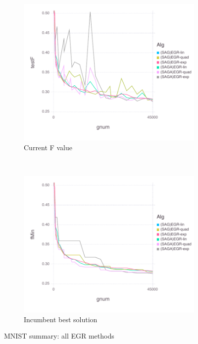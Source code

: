 \documentclass[11pt]{article}
\begin{document}
      \begin{figure}[H]
          \centering
          \begin{subfigure}[b]{0.45\textwidth}
              \includegraphics[width=\textwidth]{Figures/MNISTBLtrueFfFinal-1.pdf}
              \caption{Current F value}
          \end{subfigure}
          ~ %
            \begin{subfigure}[b]{0.45\textwidth}
                \includegraphics[width=\textwidth]{Figures/MNISTBLtrueFminfFinal-2.pdf}
                \caption{Incumbent best solution}
            \end{subfigure}
          \caption{MNIST summary: all EGR methods}\label{fig:MNISTsummary}
      \end{figure}
   
\end{document}

